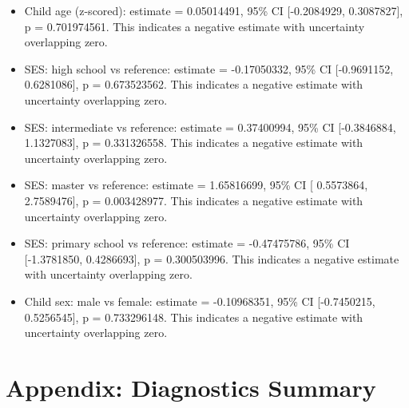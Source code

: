 \documentclass[
  letterpaper,
  DIV=11,
  numbers=noendperiod]{scrartcl}
\providecommand{\tightlist}{%
  \setlength{\itemsep}{0pt}\setlength{\parskip}{0pt}}\usepackage{longtable,booktabs,array}
\begin{document}
\begin{itemize}
\tightlist
\item
  Child age (z-scored): estimate = 0.05014491, 95\% CI {[}-0.2084929,
  0.3087827{]}, p = 0.701974561. This indicates a negative estimate with
  uncertainty overlapping zero.
\item
  SES: high school vs reference: estimate = -0.17050332, 95\% CI
  {[}-0.9691152, 0.6281086{]}, p = 0.673523562. This indicates a
  negative estimate with uncertainty overlapping zero.
\item
  SES: intermediate vs reference: estimate = 0.37400994, 95\% CI
  {[}-0.3846884, 1.1327083{]}, p = 0.331326558. This indicates a
  negative estimate with uncertainty overlapping zero.
\item
  SES: master vs reference: estimate = 1.65816699, 95\% CI {[}
  0.5573864, 2.7589476{]}, p = 0.003428977. This indicates a negative
  estimate with uncertainty overlapping zero.
\item
  SES: primary school vs reference: estimate = -0.47475786, 95\% CI
  {[}-1.3781850, 0.4286693{]}, p = 0.300503996. This indicates a
  negative estimate with uncertainty overlapping zero.
\item
  Child sex: male vs female: estimate = -0.10968351, 95\% CI
  {[}-0.7450215, 0.5256545{]}, p = 0.733296148. This indicates a
  negative estimate with uncertainty overlapping zero.
\end{itemize}

\hypertarget{appendix-diagnostics-summary}{%
\section{Appendix: Diagnostics
Summary}\label{appendix-diagnostics-summary}}
\end{document}
